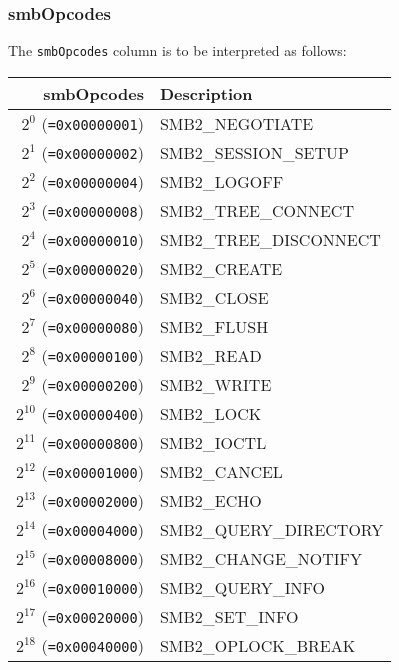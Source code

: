 \documentclass[documentation]{subfiles}
\begin{document}
\subsubsection{smbOpcodes}\label{smbOpcodes}
The {\tt smbOpcodes} column is to be interpreted as follows:
\begin{longtable}{rl}
    \toprule
    {\bf smbOpcodes} & {\bf Description}\\
    \midrule\endhead%
    $2^{0}$  ({\tt=0x00000001}) & SMB2\_NEGOTIATE\\
    $2^{1}$  ({\tt=0x00000002}) & SMB2\_SESSION\_SETUP\\
    $2^{2}$  ({\tt=0x00000004}) & SMB2\_LOGOFF\\
    $2^{3}$  ({\tt=0x00000008}) & SMB2\_TREE\_CONNECT\\
    $2^{4}$  ({\tt=0x00000010}) & SMB2\_TREE\_DISCONNECT\\
    $2^{5}$  ({\tt=0x00000020}) & SMB2\_CREATE\\
    $2^{6}$  ({\tt=0x00000040}) & SMB2\_CLOSE\\
    $2^{7}$  ({\tt=0x00000080}) & SMB2\_FLUSH\\
    $2^{8}$  ({\tt=0x00000100}) & SMB2\_READ\\
    $2^{9}$  ({\tt=0x00000200}) & SMB2\_WRITE\\
    $2^{10}$ ({\tt=0x00000400}) & SMB2\_LOCK\\
    $2^{11}$ ({\tt=0x00000800}) & SMB2\_IOCTL\\
    $2^{12}$ ({\tt=0x00001000}) & SMB2\_CANCEL\\
    $2^{13}$ ({\tt=0x00002000}) & SMB2\_ECHO\\
    $2^{14}$ ({\tt=0x00004000}) & SMB2\_QUERY\_DIRECTORY\\
    $2^{15}$ ({\tt=0x00008000}) & SMB2\_CHANGE\_NOTIFY\\
    $2^{16}$ ({\tt=0x00010000}) & SMB2\_QUERY\_INFO\\
    $2^{17}$ ({\tt=0x00020000}) & SMB2\_SET\_INFO\\
    $2^{18}$ ({\tt=0x00040000}) & SMB2\_OPLOCK\_BREAK\\
    \bottomrule
\end{longtable}
\end{document}
